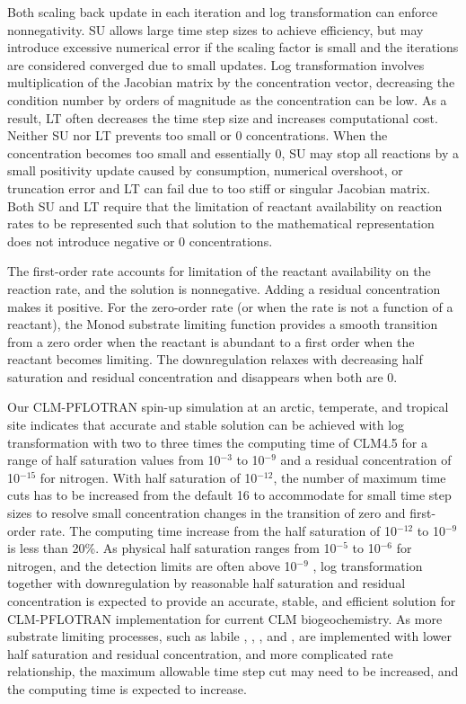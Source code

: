 \documentclass[gmd, manuscript]{copernicus}
\begin{document}
Both scaling back update in each iteration and log transformation can enforce
nonnegativity. SU allows large time step sizes to achieve efficiency, but may
introduce excessive numerical error if the scaling factor is small and the
iterations are considered converged due to small updates. Log transformation
involves multiplication of the Jacobian matrix by the concentration vector,
decreasing the condition number by orders of magnitude as the concentration can
be low. As a result, LT often decreases the time step size and increases
computational cost. Neither SU nor LT prevents too small or 0 concentrations.
When the concentration becomes too small and essentially 0, SU may stop all
reactions by a small positivity update caused by consumption, numerical
overshoot, or truncation error and LT can fail due to too stiff or singular
Jacobian matrix. Both SU and LT require that the limitation of reactant
availability on reaction rates to be represented such that solution to the
mathematical representation does not introduce negative or 0 concentrations.

The first-order rate accounts for
limitation of the reactant availability on the reaction rate, and the solution
is nonnegative. Adding a residual concentration makes it positive. For the
zero-order rate (or when the rate is not a function of a reactant), the Monod
substrate limiting function provides a smooth transition from a zero order when
the reactant is abundant to a first order when the reactant becomes
limiting. The downregulation relaxes with decreasing half saturation and
residual concentration and disappears when both are 0.

Our CLM-PFLOTRAN spin-up simulation at an arctic, temperate, and tropical site
indicates that accurate and stable solution can be achieved with log
transformation with two to three times the computing time of CLM4.5 for a range of half
saturation values from 10$^{-3}$ to 10$^{-9}$ and a residual concentration of
10$^{-15}$ for nitrogen. With half saturation of 10$^{-12}$, the number of
maximum time cuts has to be increased from the default 16 to accommodate for
small time step sizes to resolve small concentration changes in the transition
of zero and first-order rate. The computing time increase from the half
saturation of 10$^{-12}$ to 10$^{-9}$ is less than 20\%. As physical half
saturation ranges from 10$^{-5}$ to 10$^{-6}$  for nitrogen, and the
detection limits are often above 10$^{-9}$ , log transformation
together with downregulation by reasonable half saturation and residual
concentration is expected to provide an accurate, stable, and efficient solution
for CLM-PFLOTRAN implementation for current CLM biogeochemistry. As more
substrate limiting processes, such as labile , , ,
and , are implemented with lower half saturation and residual
concentration, and more complicated rate relationship, the maximum allowable
time step cut may need to be increased, and the computing time is expected to
increase.
\end{document}
